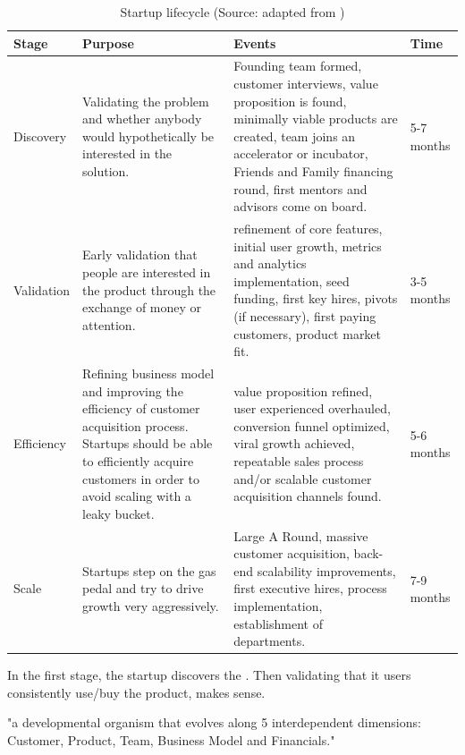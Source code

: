 \documentclass[a4paper,10pt]{book}
\begin{document}
\begin{center}
\begin{table}
  \begin{tabular}{ | l | p{5cm} | p{6cm} | p{1.8cm} | }
    \hline
    Stage 	& Purpose 						& Events	& Time \\ \hline
    Discovery 	& Validating the problem and whether anybody would hypothetically be interested in
		  the solution.
		& Founding team formed, customer interviews,
		  value proposition is found, minimally viable products are created, team joins an
		  accelerator or incubator, Friends and Family financing round, first mentors and
		  advisors come on board.		& 5-7 months \\ \hline
    Validation 	& Early validation that people are interested in
		  the product through the exchange of money or attention.
		& refinement of core features, initial user growth, metrics and analytics
		  implementation, seed funding, first key hires, pivots (if necessary), first paying
		  customers, product market fit.	& 3-5 months \\ \hline
    Efficiency 	& Refining business model and improving the efficiency of 
		  customer acquisition process. Startups should be able to efficiently acquire
		  customers in order to avoid scaling with a leaky bucket.
		& value proposition refined, user experienced overhauled, conversion
		  funnel optimized, viral growth achieved, repeatable sales process and/or
		  scalable customer acquisition channels found.	& 5-6 months \\ \hline		  
    Scale
		& Startups step on the gas pedal and try to drive growth very aggressively.
		& Large A Round, massive customer acquisition, back-end scalability
		  improvements, first executive hires, process implementation, establishment of
		  departments.		& 7-9 months \\ \hline


    \end{tabular}
    \caption{Startup lifecycle (Source: adapted from \cite{genomeOriginalReport}) \label{fig:startupLifecycle}}
  \end{table}
\end{center}

In the first stage, the startup discovers the . Then validating that it users consistently use/buy the product, makes sense.

"a developmental organism that evolves along 5
interdependent dimensions: Customer, Product, Team, Business Model and
Financials." \cite{genomePrematureScalingReport}
\end{document}
